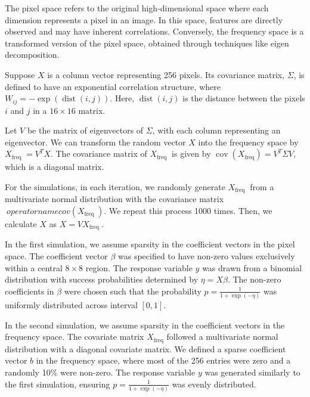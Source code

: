 \documentclass[12pt]{article}
\begin{document}
The pixel space refers to the original high-dimensional space where each dimension represents a pixel in an image. In this space, features are directly observed and may have inherent correlations. Conversely, the frequency space is a transformed version of the pixel space, obtained through techniques like eigen decomposition.

Suppose \( X \) is a column vector representing 256 pixels. Its covariance matrix, \( \Sigma \), is defined to have an exponential correlation structure, where \( W_{i j}=-\exp (\operatorname{dist}(i, j)) \). Here, \( \operatorname{dist}(i, j) \) is the distance between the pixels \( i \) and \( j \) in a \( 16 \times 16 \) matrix.

Let \( V \) be the matrix of eigenvectors of \( \Sigma \), with each column representing an eigenvector. We can transform the random vector \( X \) into the frequency space by \( X_{\text {freq }}=V^T X \). The covariance matrix of \( X_{\text {freq }} \) is given by \( \operatorname{cov}\left(X_{\mathrm{freq}}\right)=V^T \Sigma V \), which is a diagonal matrix.

For the simulations, in each iteration, we randomly generate \( X_{\text {freq }} \) from a multivariate normal distribution with the covariance matrix \(\ operatorname{cov}\left(X_{\text {freq }}\right) \). We repeat this process 1000 times. Then, we calculate \( X \) as \( X=V X_{\text {freq }} \).



In the first simulation, we assume sparsity in the coefficient vectors in the pixel space. The coefficient vector \( \beta \) was specified to have non-zero values exclusively within a central \( 8 \times 8 \) region. The response variable \( y \) was drawn from a binomial distribution with success probabilities determined by \( \eta = X \beta \). The non-zero coefficients in \( \beta \) were chosen such that the probability \( p = \frac{1}{1 + \exp(-\eta)} \) was uniformly distributed across interval \( [0, 1] \).

In the second simulation, we assume sparsity in the coefficient vectors in the frequency space. The covariate matrix \( X_{\text{freq}} \) followed a multivariate normal distribution with a diagonal covariate matrix. We defined a sparse coefficient vector \( b \) in the frequency space, where most of the 256 entries were zero and a randomly 10\% were non-zero. The response variable \( y \) was generated similarly to the first simulation, ensuring \( p = \frac{1}{1 + \exp(-\eta)} \) was evenly distributed.
\end{document}
